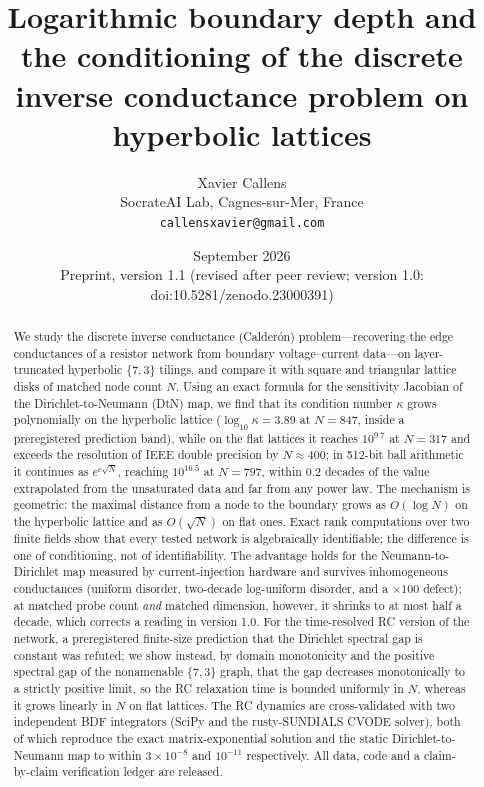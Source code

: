 \documentclass[11pt,a4paper]{article}
\title{Logarithmic boundary depth and the conditioning of the discrete\\ inverse conductance problem on hyperbolic lattices}
\author{Xavier Callens\\[2pt]
\small SocrateAI Lab, Cagnes-sur-Mer, France\\
\small \texttt{callensxavier@gmail.com}}
\date{September 2026 \\ \small Preprint, version 1.1 (revised after peer review; version 1.0: doi:10.5281/zenodo.23000391)}
\begin{document}
\maketitle

\begin{abstract}
We study the discrete inverse conductance (Calder\'on) problem---recovering the edge conductances of a resistor
network from boundary voltage--current data---on layer-truncated hyperbolic $\{7,3\}$ tilings, and compare it with
square and triangular lattice disks of matched node count $N$. Using an exact formula for the sensitivity Jacobian
of the Dirichlet-to-Neumann (DtN) map, we find that its condition number $\kappa$ grows polynomially on the
hyperbolic lattice ($\log_{10}\kappa = 3.89$ at $N=847$, inside a preregistered prediction band), while on the flat
lattices it reaches $10^{9.7}$ at $N=317$ and exceeds the resolution of IEEE double precision by $N\approx 400$;
in 512-bit ball arithmetic it continues as $e^{c\sqrt N}$, reaching $10^{16.5}$ at $N=797$, within $0.2$ decades of
the value extrapolated from the unsaturated data and far from any power law.
The mechanism is geometric: the maximal distance from a node to the boundary grows as $O(\log N)$ on the hyperbolic
lattice and as $O(\sqrt N)$ on flat ones. Exact rank computations over two finite fields show that every tested
network is algebraically identifiable; the difference is one of conditioning, not of identifiability. The
advantage holds for the Neumann-to-Dirichlet map measured by current-injection hardware and survives inhomogeneous
conductances (uniform disorder, two-decade log-uniform disorder, and a $\times100$ defect); at matched probe count
\emph{and} matched dimension, however, it shrinks to at most half a decade, which corrects a reading in version
1.0. For the time-resolved RC version of the network,
a preregistered finite-size prediction that the Dirichlet spectral gap is constant was refuted; we show instead,
by domain monotonicity and the positive spectral gap of the nonamenable $\{7,3\}$ graph, that the gap decreases
monotonically to a strictly positive limit, so the RC relaxation time is bounded uniformly in $N$, whereas it grows
linearly in $N$ on flat lattices. The RC dynamics are cross-validated with two independent BDF integrators
(SciPy and the rusty-SUNDIALS CVODE solver), both of which reproduce the exact matrix-exponential solution and the
static Dirichlet-to-Neumann map to within $3\times10^{-8}$ and $10^{-11}$ respectively. All data, code and a claim-by-claim
verification ledger are released.
\end{abstract}
\end{document}
